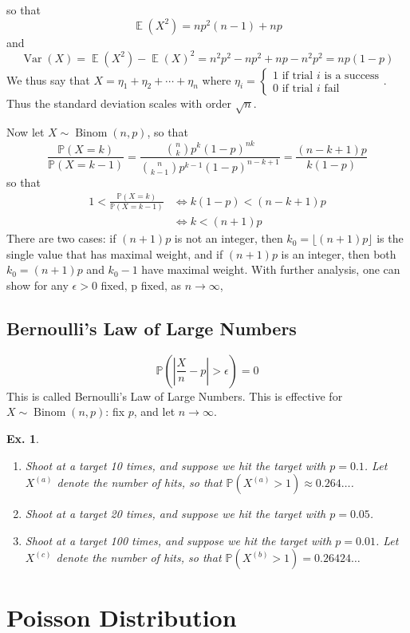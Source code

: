 \documentclass[12pt, a4paper]{book}
\DeclareMathOperator{\E}{\mathbb{E}}
\DeclareMathOperator{\Binom}{Binom}
\DeclareMathOperator{\Var}{Var}
\renewcommand{\Pr}{\mathbb{P}}
\newtheorem{example}[theorem]{Ex.}
\theoremstyle{nonumberplain}
\begin{document}
so that
\[\E(X^2)=np^2(n-1)+np\]
and
\[\Var(X)=\E(X^2)-\E(X)^2=n^2p^2-np^2+np-n^2p^2=np(1-p)\]
We thus say that $X=\eta_1+\eta_2+\cdots+\eta_n$ where $\eta_i=\begin{cases}1\text{ if trial $i$ is a success}\\0\text{ if trial $i$ fail}\end{cases}$.
Thus the standard deviation scales with order $\sqrt{n}$.

Now let $X\sim\Binom(n,p)$, so that
\[\frac{\Pr(X=k)}{\Pr(X=k-1)}=\frac{\binom{n}{k}p^k(1-p)^{nk}}{\binom{n}{k-1}p^{k-1}(1-p)^{n-k+1}}=\frac{(n-k+1)p}{k(1-p)}\]
so that
\begin{align*}
    1 <\frac{\Pr(X=k)}{\Pr(X=k-1)} &\Leftrightarrow k(1-p)<(n-k+1)p\\
                                   &\Leftrightarrow k<(n+1)p
\end{align*}
There are two cases: if $(n+1)p$ is not an integer, then $k_0=\lfloor(n+1)p\rfloor$ is the single value that has maximal weight, and if $(n+1)p$ is an integer, then both $k_0=(n+1)p$ and $k_0-1$ have maximal weight.
With further analysis, one can show for any $\epsilon>0$ fixed, p fixed, as $n\to\infty$,
\subsection{Bernoulli's Law of Large Numbers}
\[\Pr\left(\left\lvert\frac{X}{n}-p\right\rvert>\epsilon\right)=0\]
This is called Bernoulli's Law of Large Numbers.
This is effective for $X\sim\Binom(n,p)$: fix $p$, and let $n\to\infty$.
\begin{example}
    \begin{enumerate}[label=(\alph*)]
        \item Shoot at a target 10 times, and suppose we hit the target with $p=0.1$.
            Let $X^{(a)}$ denote the number of hits, so that $\Pr(X^{(a)}>1)\approx 0.264\ldots$.
        \item Shoot at a target 20 times, and suppose we hit the target with $p=0.05$.
        \item Shoot at a target 100 times, and suppose we hit the target with $p=0.01$.
            Let $X^{(c)}$ denote the number of hits, so that $\Pr(X^{(b)}>1)=0.26424\ldots$
    \end{enumerate}
\end{example}
\section{Poisson Distribution}
\end{document}
